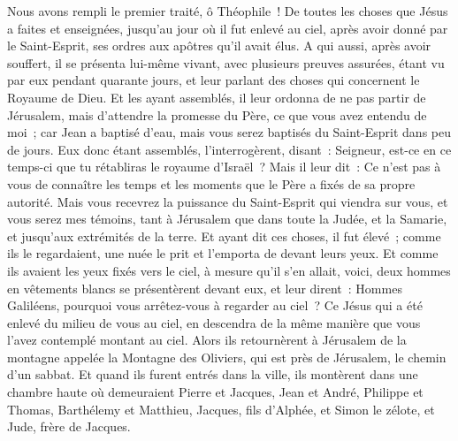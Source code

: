 \begin{multicols}{2}
\VerseOne{}Nous avons rempli le premier traité, ô Théophile~! De toutes les choses que Jésus a faites et enseignées, 
jusqu'au jour où il fut enlevé au ciel, après avoir donné par le Saint-Esprit, ses ordres aux apôtres qu'il avait élus.
A qui aussi, après avoir souffert, il se présenta lui-même vivant, avec plusieurs preuves assurées, étant vu par eux pendant quarante jours, et leur parlant des choses qui concernent le Royaume de Dieu.
Et les ayant assemblés, il leur ordonna de ne pas partir de Jérusalem, mais d'attendre la promesse du Père, ce que vous avez entendu de moi~;
car Jean a baptisé d'eau, mais vous serez baptisés du Saint-Esprit dans peu de jours.
Eux donc étant assemblés, l'interrogèrent, disant~: Seigneur, est-ce en ce temps-ci que tu rétabliras le royaume d'Israël~?
Mais il leur dit~: Ce n'est pas à vous de connaître les temps et les moments que le Père a fixés de sa propre autorité.
Mais vous recevrez la puissance du Saint-Esprit qui viendra sur vous, et vous serez mes témoins, tant à Jérusalem que dans toute la Judée, et la Samarie, et jusqu'aux extrémités de la terre.
Et ayant dit ces choses, il fut élevé~; comme ils le regardaient, une nuée le prit et l'emporta de devant leurs yeux.
Et comme ils avaient les yeux fixés vers le ciel, à mesure qu'il s'en allait, voici, deux hommes en vêtements blancs se présentèrent devant eux,
et leur dirent~: Hommes Galiléens, pourquoi vous arrêtez-vous à regarder au ciel~? Ce Jésus qui a été enlevé du milieu de vous au ciel, en descendra de la même manière que vous l'avez contemplé montant au ciel.
Alors ils retournèrent à Jérusalem de la montagne appelée la Montagne des Oliviers, qui est près de Jérusalem, le chemin d'un sabbat.
Et quand ils furent entrés dans la ville, ils montèrent dans une chambre haute où demeuraient Pierre et Jacques, Jean et André, Philippe et Thomas, Barthélemy et Matthieu, Jacques, fils d'Alphée, et Simon le zélote, et Jude, frère de Jacques.

\end{multicols}
